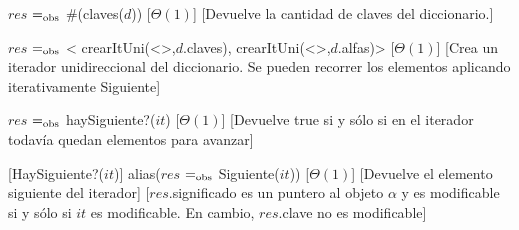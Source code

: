 \begin{Interfaz}
  {$res$ $=_{\mathrm{obs}}$ \#(claves($d$))}
  [$\Theta(1)$]
  [Devuelve la cantidad de claves del diccionario.]
  

  {$res$ $=_{\mathrm{obs}}$ < crearItUni(<>,$d$.claves), crearItUni(<>,$d$.alfas)>}
  [$\Theta(1)$]
  [Crea un iterador unidireccional del diccionario. Se pueden recorrer los elementos aplicando iterativamente Siguiente]
  
  {$res$ $=_{\mathrm{obs}}$ haySiguiente?($it$)}
  [$\Theta(1)$]
  [Devuelve true si y sólo si en el iterador todavía quedan elementos para avanzar]
    



  [HaySiguiente?($it$)]
  {alias($res$ $=_{\mathrm{obs}}$ Siguiente($it$))}
  [$\Theta(1)$]
  [Devuelve el elemento siguiente del iterador]
  [$res$.significado es un puntero al objeto $\alpha$ y es modificable si y sólo si $it$ es modificable. En cambio, $res$.clave no es modificable] 


\end{Interfaz}
